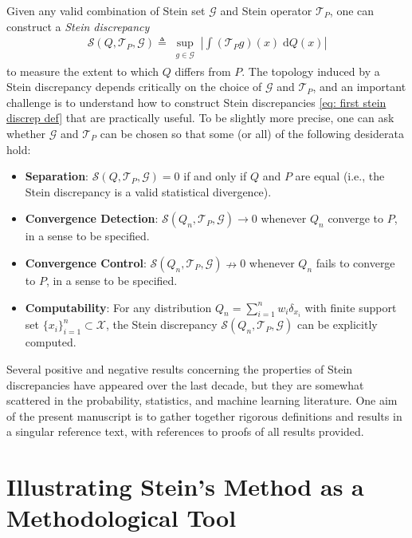 \documentclass[12pt,paper=letter]{scrreprt}
\def\defeq{\triangleq} %
\begin{document}
Given any valid combination of Stein set $\mathcal{G}$ and Stein operator $\mathcal{T}_P$, one can construct a \emph{Stein discrepancy}
\begin{align}
    \mathcal{S}(Q,\mathcal{T}_P,\mathcal{G}) \defeq \sup_{\substack{g \in \mathcal{G}}}
    \left|\int (\mathcal{T}_P g)(x) \; \mathrm{d}Q(x)\right|  \label{eq: first stein discrep def}
\end{align}
to measure the extent to which $Q$ differs from $P$.
The topology induced by a Stein discrepancy depends critically on the choice of $\mathcal{G}$ and $\mathcal{T}_P$, and an important challenge is to understand how to construct Stein discrepancies \eqref{eq: first stein discrep def} that are practically useful. 
To be slightly more precise, one can ask whether $\mathcal{G}$ and $\mathcal{T}_P$ can be chosen so that some (or all) of the following desiderata hold:
\begin{itemize}
    \item \textbf{Separation}:  $\mathcal{S}(Q,\mathcal{T}_P , \mathcal{G}) = 0$ if and only if $Q$ and $P$ are equal (i.e., the Stein discrepancy is a valid statistical divergence).
    \item \textbf{Convergence Detection}: $\mathcal{S}(Q_n,\mathcal{T}_P , \mathcal{G}) \rightarrow 0$ whenever $Q_n$ converge to $P$, in a sense to be specified.  
    \item \textbf{Convergence Control}: $\mathcal{S}(Q_n,\mathcal{T}_P , \mathcal{G}) \nrightarrow 0$ whenever $Q_n$ fails to converge to $P$, in a sense to be specified.
    \item \textbf{Computability}:  For any distribution $Q_n = \sum_{i=1}^n w_i \delta_{x_i}$ with finite support set $\{x_i\}_{i=1}^n \subset \mathcal{X}$, the Stein discrepancy $\mathcal{S}(Q_n,\mathcal{T}_P,\mathcal{G})$ can be explicitly computed.
\end{itemize}

\noindent Several positive and negative results concerning the properties of Stein discrepancies have appeared over the last decade, but they are somewhat scattered in the probability, statistics, and machine learning literature. 
One aim of the present manuscript is to gather together rigorous definitions and results in a singular reference text, with references to proofs of all results provided.




\section{Illustrating Stein's Method as a Methodological Tool}
\label{sec: Stein as a tool}
\end{document}
